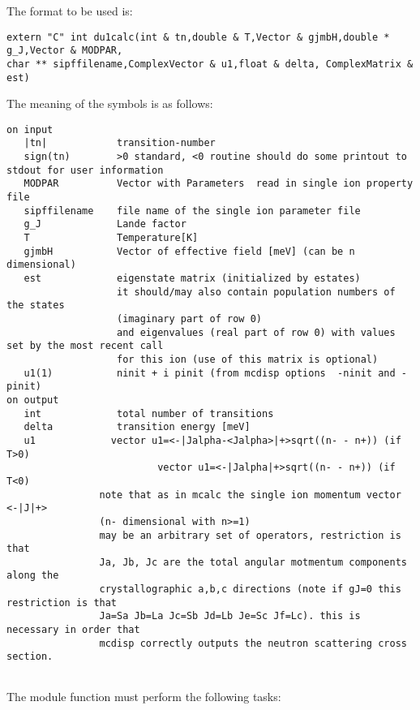 The format to be used is:
{\footnotesize
\begin{verbatim}
extern "C" int du1calc(int & tn,double & T,Vector & gjmbH,double * g_J,Vector & MODPAR,
char ** sipffilename,ComplexVector & u1,float & delta, ComplexMatrix & est)
\end{verbatim}

The meaning of the symbols is as follows:

\begin{verbatim}
on input
   |tn|            transition-number  
   sign(tn)        >0 standard, <0 routine should do some printout to stdout for user information
   MODPAR          Vector with Parameters  read in single ion property file
   sipffilename    file name of the single ion parameter file
   g_J             Lande factor
   T               Temperature[K]
   gjmbH           Vector of effective field [meV] (can be n dimensional)
   est             eigenstate matrix (initialized by estates)
                   it should/may also contain population numbers of the states
				   (imaginary part of row 0)
                   and eigenvalues (real part of row 0) with values set by the most recent call
				   for this ion (use of this matrix is optional)
   u1(1)           ninit + i pinit (from mcdisp options  -ninit and -pinit)
on output
   int             total number of transitions
   delta           transition energy [meV]
   u1             vector u1=<-|Jalpha-<Jalpha>|+>sqrt((n- - n+)) (if T>0)
                          vector u1=<-|Jalpha|+>sqrt((n- - n+)) (if T<0)
                note that as in mcalc the single ion momentum vector <-|J|+> 
				(n- dimensional with n>=1)
                may be an arbitrary set of operators, restriction is that 
                Ja, Jb, Jc are the total angular motmentum components along the
                crystallographic a,b,c directions (note if gJ=0 this restriction is that
                Ja=Sa Jb=La Jc=Sb Jd=Lb Je=Sc Jf=Lc). this is necessary in order that
                mcdisp correctly outputs the neutron scattering cross section.
				
\end{verbatim}
}
The module function must perform the following tasks:
